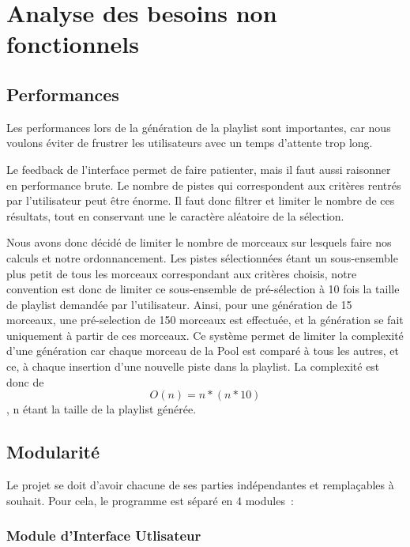 \section{Analyse des besoins non fonctionnels}
\label{besoins:nfonc}

\subsection{Performances}
\label{besoins:nfonc:perf}

Les performances lors de la génération de la playlist sont importantes, car nous
voulons éviter de frustrer les utilisateurs avec un temps d'attente trop long.

Le feedback de l’interface permet de faire patienter, mais il faut aussi 
raisonner en performance brute. Le nombre de pistes qui correspondent aux 
critères rentrés par l’utilisateur peut être énorme. Il faut donc filtrer et 
limiter le nombre de ces résultats, tout en conservant une le caractère 
aléatoire de la sélection.

Nous avons donc décidé de limiter le nombre de morceaux sur lesquels faire nos 
calculs et notre ordonnancement. Les pistes sélectionnées étant un 
sous-ensemble plus petit de tous les morceaux correspondant aux critères 
choisis, notre convention est donc de limiter ce sous-ensemble de pré-sélection 
à 10 fois la taille de playlist demandée par l’utilisateur. Ainsi, pour une 
génération de 15 morceaux, une pré-selection de 150 morceaux est effectuée, 
et la génération se fait uniquement à partir de ces morceaux. Ce système permet 
de limiter la complexité d'une génération car chaque morceau de la Pool est 
comparé à tous les autres, et ce, à chaque insertion d'une nouvelle piste dans 
la playlist. La complexité est donc de \[O(n) = n*(n*10)\], n étant la taille 
de la playlist générée.

\subsection{Modularité}
\label{besoins:nfonc:perf:mod}
    
Le projet se doit d'avoir chacune de ses parties indépendantes et remplaçables 
à souhait. Pour cela, le programme est séparé en 4 modules~:

\subsubsection{Module d'Interface Utlisateur}
\label{besoins:nfonc:perf:mod:iu}

